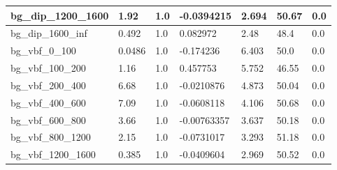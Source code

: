 \documentclass[a4paper, 10pt]{article}
\begin{document}
\begin{table}[H]
\begin{center}
\begin{tabular}{|m{23.0mm}|m{23.0mm}|m{18.0mm}|m{19.0mm}|m{19.0mm}|m{19.0mm}|m{19.0mm}|}
      \hline
      {\cellcolor{white}         bg\_dip\_1200\_1600}& {\cellcolor{white}         1.92}& {\cellcolor{white}         1.0}& {\cellcolor{white}         -0.0394215}& {\cellcolor{white}         2.694}& {\cellcolor{red}         50.67}& {\cellcolor{red}         0.0}\\
      \hline
      {\cellcolor{white}         bg\_dip\_1600\_inf}& {\cellcolor{white}         0.492}& {\cellcolor{white}         1.0}& {\cellcolor{white}         0.082972}& {\cellcolor{white}         2.48}& {\cellcolor{red}         48.4}& {\cellcolor{red}         0.0}\\
      \hline
      {\cellcolor{white}         bg\_vbf\_0\_100}& {\cellcolor{white}         0.0486}& {\cellcolor{white}         1.0}& {\cellcolor{white}         -0.174236}& {\cellcolor{white}         6.403}& {\cellcolor{red}         50.0}& {\cellcolor{red}         0.0}\\
      \hline
      {\cellcolor{white}         bg\_vbf\_100\_200}& {\cellcolor{white}         1.16}& {\cellcolor{white}         1.0}& {\cellcolor{white}         0.457753}& {\cellcolor{white}         5.752}& {\cellcolor{red}         46.55}& {\cellcolor{red}         0.0}\\
      \hline
      {\cellcolor{white}         bg\_vbf\_200\_400}& {\cellcolor{white}         6.68}& {\cellcolor{white}         1.0}& {\cellcolor{white}         -0.0210876}& {\cellcolor{white}         4.873}& {\cellcolor{red}         50.04}& {\cellcolor{red}         0.0}\\
      \hline
      {\cellcolor{white}         bg\_vbf\_400\_600}& {\cellcolor{white}         7.09}& {\cellcolor{white}         1.0}& {\cellcolor{white}         -0.0608118}& {\cellcolor{white}         4.106}& {\cellcolor{red}         50.68}& {\cellcolor{red}         0.0}\\
      \hline
      {\cellcolor{white}         bg\_vbf\_600\_800}& {\cellcolor{white}         3.66}& {\cellcolor{white}         1.0}& {\cellcolor{white}         -0.00763357}& {\cellcolor{white}         3.637}& {\cellcolor{red}         50.18}& {\cellcolor{red}         0.0}\\
      \hline
      {\cellcolor{white}         bg\_vbf\_800\_1200}& {\cellcolor{white}         2.15}& {\cellcolor{white}         1.0}& {\cellcolor{white}         -0.0731017}& {\cellcolor{white}         3.293}& {\cellcolor{red}         51.18}& {\cellcolor{red}         0.0}\\
      \hline
      {\cellcolor{white}         bg\_vbf\_1200\_1600}& {\cellcolor{white}         0.385}& {\cellcolor{white}         1.0}& {\cellcolor{white}         -0.0409604}& {\cellcolor{white}         2.969}& {\cellcolor{red}         50.52}& {\cellcolor{red}         0.0}\\

\end{tabular}
\end{center}
\end{table}
\end{document}

